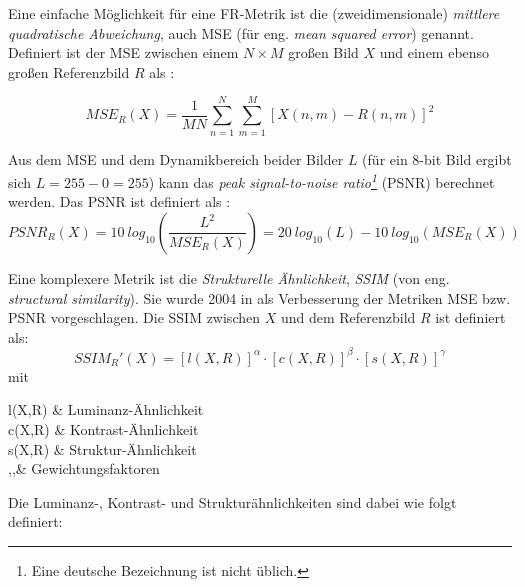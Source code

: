 Eine einfache Möglichkeit für eine FR-Metrik ist die (zweidimensionale) \textit{mittlere quadratische Abweichung}, auch MSE (für eng. \textit{mean squared error}) genannt. Definiert ist der MSE zwischen einem $N \times M$ großen Bild $X$ und einem ebenso großen Referenzbild $R$ als \cite{Tan2013}:

\begin{equation}
	MSE_R(X)=\frac{1}{M N} \sum_{n=1}^{N} \sum_{m=1}^{M} [X(n,m) - R(n,m)]^2
\end{equation}

Aus dem MSE und dem Dynamikbereich beider Bilder $L$ (für ein 8-bit Bild ergibt sich $L=255-0=255$) kann das \textit{peak signal-to-noise ratio\footnote{Eine deutsche Bezeichnung ist nicht üblich.}} (PSNR) berechnet werden. Das PSNR ist definiert als \cite{Bondzulic2016}:
\begin{equation}
	PSNR_R(X)= 10\: log_{10}\left(\frac{L^2}{MSE_R(X)}\right) = 20\: log_{10}(L) - 10\: log_{10}(MSE_R(X))
\end{equation}

Eine komplexere Metrik ist die \textit{Strukturelle Ähnlichkeit}, \textit{SSIM} (von eng. \textit{structural similarity}). Sie wurde 2004 in \cite{Wang2004} als Verbesserung der Metriken MSE bzw. PSNR vorgeschlagen. Die SSIM zwischen $X$ und dem Referenzbild $R$ ist definiert als:
\begin{equation}
	SSIM_R'(X)=[l(X,R)]^\alpha\cdot[c(X,R)]^\beta\cdot[s(X,R)]^\gamma
\end{equation}
mit
\begin{with}
	l(X,R) & Luminanz-Ähnlichkeit\\
	c(X,R) & Kontrast-Ähnlichkeit\\
	s(X,R) & Struktur-Ähnlichkeit\\
	\alpha,\beta,\gamma & Gewichtungsfaktoren \\
\end{with}

Die Luminanz-, Kontrast- und Strukturähnlichkeiten sind dabei wie folgt definiert:

